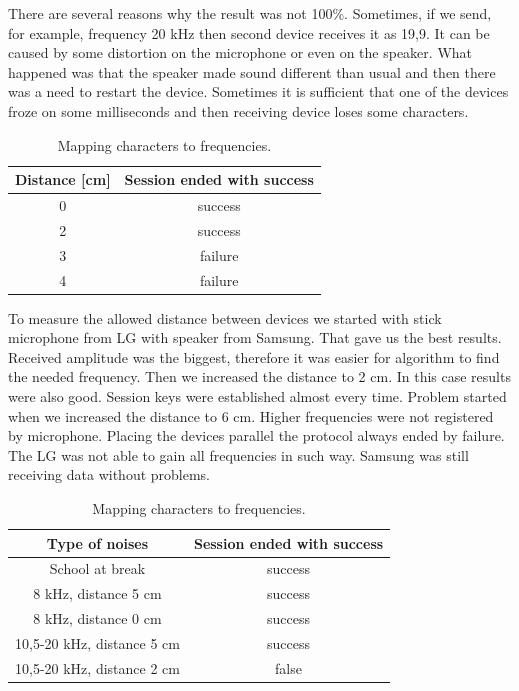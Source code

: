 \documentclass[11pt,titlepage]{article}
\theoremstyle{plain}
\begin{document}
\vspace{5mm}

There are several reasons why the result was not 100\%. Sometimes, if we send, for example, frequency 20 kHz then second device receives it as 19,9. It can be caused by some distortion on the microphone or even on the speaker. What happened was that the speaker made sound different than usual and then there was a need to restart the device. Sometimes it is sufficient that one of the devices froze on some milliseconds and then receiving device loses some characters. 

\vspace{5mm}

\begin{table}[H]
	\centering
	\begin{tabular}{| c | c |}
		\hline
		Distance [cm] & Session ended with success \\
		\hline
		0 & success \\
		\hline
		2 & success \\
		\hline
		3 & failure \\
		\hline
		4 & failure \\
		\hline
	\end{tabular}
	\caption{Mapping characters to frequencies.}
\end{table}

To measure the allowed distance between devices we started with stick microphone from LG with speaker from Samsung. That gave us the best results. Received amplitude was the biggest, therefore it was easier for algorithm to find the needed frequency. Then we increased the distance to 2 cm. In this case results were also good. Session keys were established almost every time. Problem started when we increased the distance to 6 cm. Higher frequencies were not registered by microphone. Placing the devices parallel the protocol always ended by failure. The LG was not able to gain all frequencies in such way. Samsung was still receiving data without problems. 

\vspace{5mm}

	\begin{table}[H]
		\centering
		\begin{tabular}{| c | c |}
			\hline
			Type of noises & Session ended with success \\
			\hline
			School at break & success \\
			\hline
			8 kHz, distance 5 cm & success \\
			\hline
			8 kHz, distance 0 cm & success \\
			\hline
			10,5-20 kHz, distance 5 cm & success \\
			\hline
			10,5-20 kHz, distance 2 cm & false \\
			\hline
		\end{tabular}
		\caption{Mapping characters to frequencies.}
	\end{table}
\end{document}
